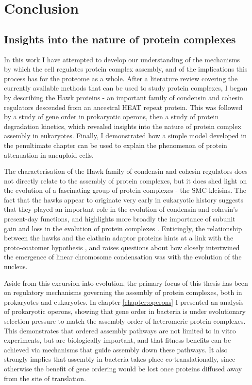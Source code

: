 \documentclass[a4paper,11pt,twoside,openright]{scrbook}
\begin{document}
\chapter{Conclusion}
\section{Insights into the nature of protein complexes}
In this work I have attempted to develop our understanding of the mechanisms by which the cell regulates protein complex assembly, and of the implications this process has for the proteome as a whole. After a literature review covering the currently available methods that can be used to study protein complexes, I began by describing the Hawk proteins - an important family of condensin and cohesin regulators descended from an ancestral HEAT repeat protein. This was followed by a study of gene order in prokaryotic operons, then a study of protein degradation kinetics, which revealed insights into the nature of protein complex assembly in eukaryotes. Finally, I demonstrated how a simple model developed in the penultimate chapter can be used to explain the phenomenon of protein attenuation in aneuploid cells.

The characterisation of the Hawk family of condensin and cohesin regulators does not directly relate to the assembly of protein complexes, but it does shed light on the evolution of a fascinating group of protein complexes - the SMC-kleisins. The fact that the hawks appear to originate very early in eukaryotic history suggests that they played an important role in the evolution of condensin and cohesin's present-day functions, and highlights more broadly the importance of subunit gain and loss in the evolution of protein complexes \cite{Seidl2009,Wan2015}. Enticingly, the relationship between the hawks and the clathrin adaptor proteins hints at a link with the proto-coatomer hypothesis \cite{Devos2006,Field2011}, and raises questions about how closely intertwined the emergence of linear chromosome condensation was with the evolution of the nucleus.

Aside from this excursion into evolution, the primary focus of this thesis has been on regulatory mechanisms governing the assembly of protein complexes, both in prokaryotes and eukaryotes. In chapter \ref{chapter:operons} I presented an analysis of prokaryotic operons, showing that gene order in bacteria is under evolutionary selection pressure to match the assembly order of heteromeric protein complexes. This demonstrates that ordered assembly pathways are not limited to in vitro experiments, but are biologically important, and that fitness benefits can be achieved via mechanisms that guide assembly down these pathways. It also strongly implies that assembly in bacteria takes place co-translationally, since otherwise the benefit of gene ordering would be lost once proteins diffused away from the site of translation.
\end{document}
